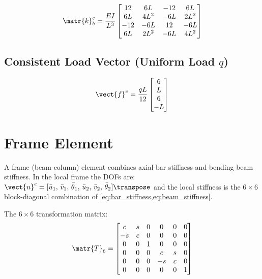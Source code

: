 \begin{importantbox}
\begin{equation*}
    \matr{k}^e_b = \frac{EI}{L^3}
    \begin{bmatrix}
         12  &  6L  & -12  &  6L  \\
         6L  &  4L^2 & -6L  &  2L^2 \\
        -12  & -6L  &  12  & -6L  \\
         6L  &  2L^2 & -6L  &  4L^2
    \end{bmatrix}
\end{equation*}
\end{importantbox}

\subsection{Consistent Load Vector (Uniform Load $q$)}

\begin{equation}
    \vect{f}^e = \frac{qL}{12}
    \begin{bmatrix} 6 \\ L \\ 6 \\ -L \end{bmatrix}
    \label{eq:beam_load}
\end{equation}

\section{Frame Element}

A frame (beam-column) element combines axial bar stiffness and bending beam
stiffness. In the local frame the DOFs are:
$\vect{u}^e = [\bar{u}_1,\, \bar{v}_1,\, \bar{\theta}_1,\,
               \bar{u}_2,\, \bar{v}_2,\, \bar{\theta}_2]\transpose$
and the local stiffness is the $6\times6$ block-diagonal combination of
\cref{eq:bar_stiffness,eq:beam_stiffness}.

The $6\times6$ transformation matrix:
\begin{equation}
    \matr{T}_6 = \begin{bmatrix} c & s & 0 & 0 & 0 & 0 \\
                                 -s & c & 0 & 0 & 0 & 0 \\
                                  0 & 0 & 1 & 0 & 0 & 0 \\
                                  0 & 0 & 0 & c & s & 0 \\
                                  0 & 0 & 0 &-s & c & 0 \\
                                  0 & 0 & 0 & 0 & 0 & 1
                 \end{bmatrix}
    \label{eq:frame_T}
\end{equation}

